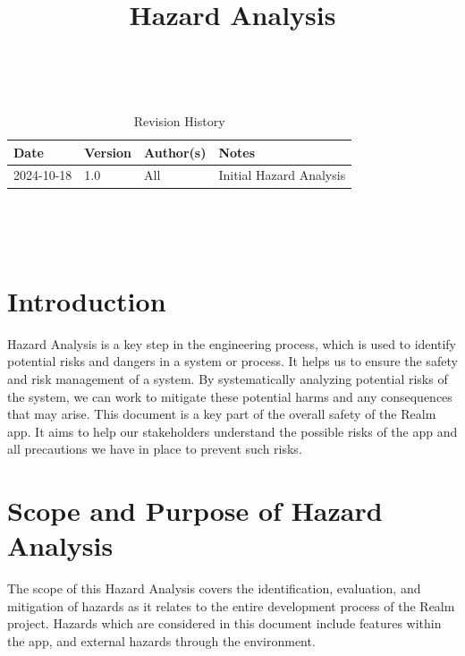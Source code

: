 \documentclass{article}
\title{Hazard Analysis\\\progname}
\author{\authname}
\date{}
\begin{document}
\maketitle
\thispagestyle{empty}

~\newpage


\begin{table}[hp]
    \caption{Revision History} \label{rev_history_table}
    \begin{tabularx}{\textwidth}{p{3cm}p{2cm}p{3cm}X}
        \toprule {\textbf{Date}} & {\textbf{Version}} & {\textbf{Author(s)}} & {\textbf{Notes}} \\
        \midrule
        2024-10-18               & 1.0         & All      & Initial Hazard Analysis      \\
        \bottomrule
    \end{tabularx}
\end{table}

~\newpage

\tableofcontents

~\newpage


\section{Introduction}

Hazard Analysis is a key step in the engineering process, which is used to identify potential risks and dangers in a system or process. It helps us to ensure the safety and risk management of a system. By systematically analyzing potential risks of the system, we can work to mitigate these potential harms and any consequences that may arise. This document is a key part of the overall safety of the Realm app. It aims to help our stakeholders understand the possible risks of the app and all precautions we have in place to prevent such risks.

\section{Scope and Purpose of Hazard Analysis}

The scope of this Hazard Analysis covers the identification, evaluation, and mitigation of hazards as it relates to the entire development process of the Realm project. Hazards which are considered in this document include features within the app, and external hazards through the environment.\\
\end{document}
